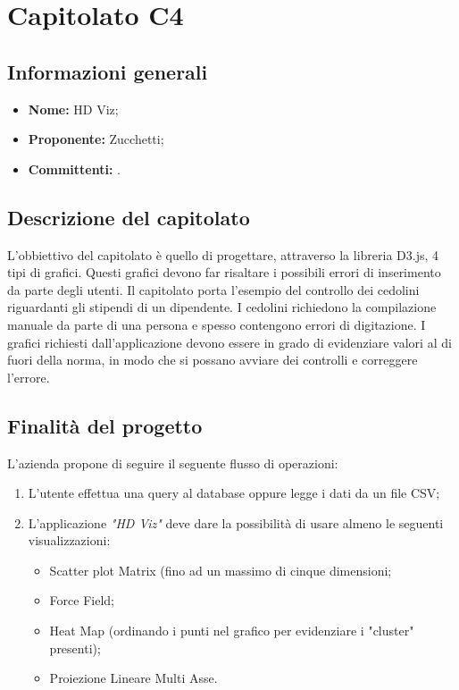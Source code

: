 \section{Capitolato C4}

\subsection{Informazioni generali}
\begin{itemize}
\item \textbf{Nome:} HD Viz;
\item \textbf{Proponente:} Zucchetti;
\item \textbf{Committenti:} \committenti{}.
\end{itemize}

\subsection{Descrizione del capitolato}
L'obbiettivo del capitolato è quello di progettare, attraverso la libreria D3.js, 4 tipi di grafici. Questi grafici devono far risaltare i possibili errori di inserimento da parte degli utenti.
Il capitolato porta l'esempio del controllo dei cedolini riguardanti gli stipendi di un dipendente. I cedolini richiedono la compilazione manuale da parte di una persona e spesso contengono errori di digitazione. I grafici richiesti dall'applicazione devono essere in grado di evidenziare valori al di fuori della norma, in modo che si possano avviare dei controlli e correggere l'errore.

\subsection{Finalità del progetto}
L'azienda propone di seguire il seguente flusso di operazioni:
\begin{enumerate}
\item L'utente effettua una query al database oppure legge i dati da un file CSV;
\item L'applicazione \textit{"HD Viz"} deve dare la possibilità di usare almeno le seguenti visualizzazioni:
    \begin{itemize}
    \item Scatter plot Matrix (fino ad un massimo di cinque dimensioni;
    \item Force Field;
    \item Heat Map (ordinando i punti nel grafico per evidenziare i "cluster" presenti);
    \item Proiezione Lineare Multi Asse.
    \end{itemize}
\end{enumerate}

